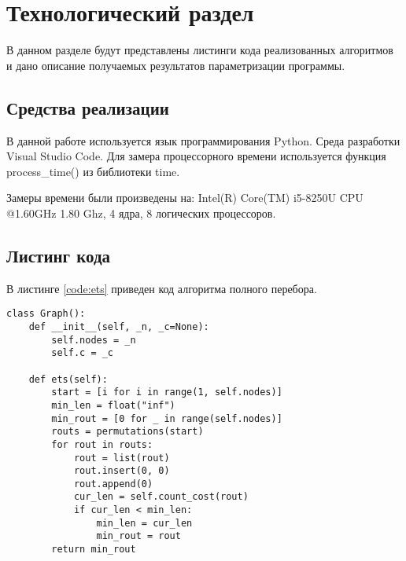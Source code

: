\chapter{Технологический раздел}
\label{cha:impl}
В данном разделе будут представлены листинги кода реализованных алгоритмов и дано описание получаемых результатов параметризации программы.

\section{Средства реализации}
\label{sec:realisation}
В данной работе используется язык программирования Python. Среда разработки Visual Studio Code. Для замера процессорного времени используется функция process\_time() из библиотеки time.
\par Замеры времени были произведены на: Intel(R) Core(TM) i5-8250U CPU @1.60GHz 1.80 Ghz, 4 ядра, 8 логических процессоров.

\section{Листинг кода}
\label{sec:listings}
В листинге \ref{code:ets} приведен код алгоритма полного перебора.
\begin{lstlisting}[caption= Алгоритм полного перебора, label=code:ets]
class Graph():
	def __init__(self, _n, _c=None):
		self.nodes = _n
		self.c = _c
	
	def ets(self):
		start = [i for i in range(1, self.nodes)]
		min_len = float("inf")
		min_rout = [0 for _ in range(self.nodes)]
		routs = permutations(start)
		for rout in routs:
			rout = list(rout)
			rout.insert(0, 0)
			rout.append(0)
			cur_len = self.count_cost(rout)
			if cur_len < min_len:
				min_len = cur_len
				min_rout = rout
		return min_rout
\end{lstlisting}

